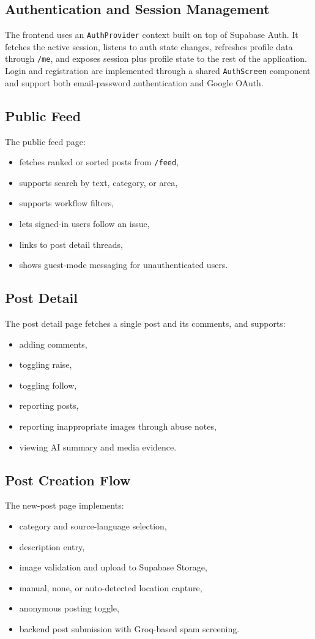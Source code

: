 \documentclass[12pt,a4paper]{report}
\begin{document}
\subsection{Authentication and Session Management}
The frontend uses an \texttt{AuthProvider} context built on top of Supabase Auth. It fetches the active session, listens to auth state changes, refreshes profile data through \texttt{/me}, and exposes session plus profile state to the rest of the application. Login and registration are implemented through a shared \texttt{AuthScreen} component and support both email-password authentication and Google OAuth.

\subsection{Public Feed}
The public feed page:
\begin{itemize}
  \item fetches ranked or sorted posts from \texttt{/feed},
  \item supports search by text, category, or area,
  \item supports workflow filters,
  \item lets signed-in users follow an issue,
  \item links to post detail threads,
  \item shows guest-mode messaging for unauthenticated users.
\end{itemize}

\subsection{Post Detail}
The post detail page fetches a single post and its comments, and supports:
\begin{itemize}
  \item adding comments,
  \item toggling raise,
  \item toggling follow,
  \item reporting posts,
  \item reporting inappropriate images through abuse notes,
  \item viewing AI summary and media evidence.
\end{itemize}

\subsection{Post Creation Flow}
The new-post page implements:
\begin{itemize}
  \item category and source-language selection,
  \item description entry,
  \item image validation and upload to Supabase Storage,
  \item manual, none, or auto-detected location capture,
  \item anonymous posting toggle,
  \item backend post submission with Groq-based spam screening.
\end{itemize}
\end{document}
